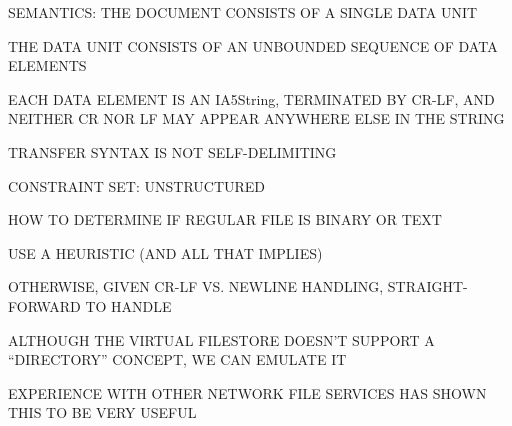 \begin{bwslide}

\begin{nrtc}
\item	SEMANTICS: THE DOCUMENT CONSISTS OF A SINGLE DATA UNIT
    \begin{nrtc}
    \item	THE DATA UNIT CONSISTS OF AN UNBOUNDED SEQUENCE OF DATA
		ELEMENTS

    \item	EACH DATA ELEMENT IS AN IA5String, TERMINATED BY CR-LF,
		AND NEITHER CR NOR LF MAY APPEAR ANYWHERE ELSE IN THE STRING

    \item	TRANSFER SYNTAX IS NOT SELF-DELIMITING
    \end{nrtc}

\item	CONSTRAINT SET: UNSTRUCTURED

\item	HOW TO DETERMINE IF REGULAR FILE IS BINARY OR TEXT
    \begin{nrtc}
    \item	USE A HEURISTIC (AND ALL THAT IMPLIES)
    \end{nrtc}

\item	OTHERWISE, GIVEN CR-LF VS. NEWLINE HANDLING, STRAIGHT-FORWARD TO
	HANDLE
\end{nrtc}
\end{bwslide}


\begin{bwslide}

\begin{nrtc}
\item	ALTHOUGH THE VIRTUAL FILESTORE DOESN'T SUPPORT A ``DIRECTORY''
	CONCEPT, WE CAN EMULATE IT

\item	EXPERIENCE WITH OTHER NETWORK FILE SERVICES HAS SHOWN THIS TO BE
	VERY USEFUL
\end{nrtc}
\end{bwslide}


